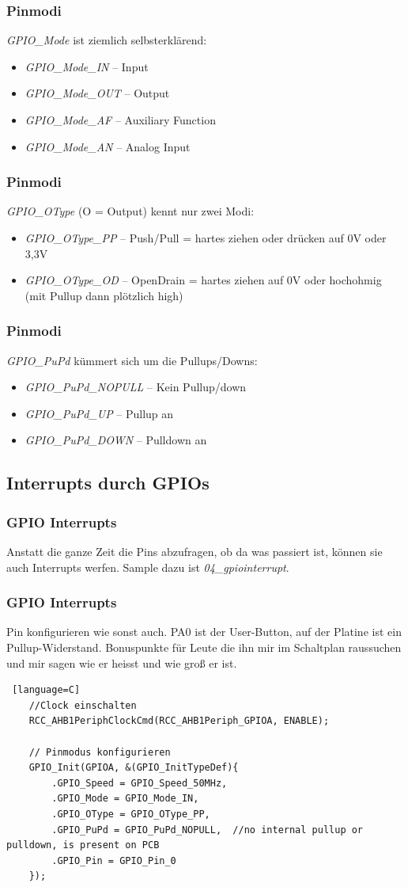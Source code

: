 \documentclass[ngerman,compress]{beamer}
\begin{document}
\begin{frame}
	\frametitle{Pinmodi}
	\emph{GPIO\_Mode} ist ziemlich selbsterklärend:
	\begin{itemize}
		\item \emph{GPIO\_Mode\_IN} -- Input
		\item \emph{GPIO\_Mode\_OUT} -- Output
		\item \emph{GPIO\_Mode\_AF} -- Auxiliary Function
		\item \emph{GPIO\_Mode\_AN} -- Analog Input
	\end{itemize}
\end{frame}

\begin{frame}
	\frametitle{Pinmodi}
	\emph{GPIO\_OType} (O = Output) kennt nur zwei Modi:
	\begin{itemize}
		\item \emph{GPIO\_OType\_PP} -- Push/Pull = hartes ziehen oder drücken auf 0V oder 3,3V
		\item \emph{GPIO\_OType\_OD} -- OpenDrain = hartes ziehen auf 0V oder hochohmig (mit Pullup dann plötzlich high)
	\end{itemize}
\end{frame}

\begin{frame}
	\frametitle{Pinmodi}
	\emph{GPIO\_PuPd} kümmert sich um die Pullups/Downs:
	\begin{itemize}
		\item \emph{GPIO\_PuPd\_NOPULL} -- Kein Pullup/down
		\item \emph{GPIO\_PuPd\_UP} -- Pullup an
		\item \emph{GPIO\_PuPd\_DOWN} -- Pulldown an
	\end{itemize}
\end{frame}


\subsection{Interrupts durch GPIOs}

\begin{frame}
	\frametitle{GPIO Interrupts}
	Anstatt die ganze Zeit die Pins abzufragen, ob da was passiert ist, können sie auch Interrupts werfen. Sample dazu ist \emph{04\_gpiointerrupt}.
\end{frame}

\begin{frame} [fragile]
	\frametitle{GPIO Interrupts}
	Pin konfigurieren wie sonst auch. PA0 ist der User-Button, auf der Platine ist ein Pullup-Widerstand. Bonuspunkte für Leute die ihn mir im Schaltplan raussuchen und mir sagen wie er heisst und wie groß er ist.
	\begin{lstlisting} [language=C]
	//Clock einschalten
	RCC_AHB1PeriphClockCmd(RCC_AHB1Periph_GPIOA, ENABLE);

	// Pinmodus konfigurieren
	GPIO_Init(GPIOA, &(GPIO_InitTypeDef){
		.GPIO_Speed = GPIO_Speed_50MHz,
		.GPIO_Mode = GPIO_Mode_IN,
		.GPIO_OType = GPIO_OType_PP,
		.GPIO_PuPd = GPIO_PuPd_NOPULL,	//no internal pullup or pulldown, is present on PCB
		.GPIO_Pin = GPIO_Pin_0
	});
	\end{lstlisting}
\end{frame}
\end{document}
